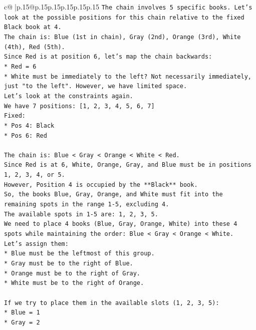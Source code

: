 \documentclass{article}
\begin{document}
{\begin{supertabular}{c@{$\;$}|p{.15\linewidth}@{}p{.15\linewidth}p{.15\linewidth}p{.15\linewidth}p{.15\linewidth}p{.15\linewidth}}
{{{\texttt{The chain involves 5 specific books. Let's look at the possible positions for this chain relative to the fixed Black book at 4.} \\
\texttt{The chain is: Blue (1st in chain), Gray (2nd), Orange (3rd), White (4th), Red (5th).} \\
\texttt{Since Red is at position 6, let's map the chain backwards:} \\
\texttt{*   Red = 6} \\
\texttt{*   White must be immediately to the left? Not necessarily immediately, just "to the left". However, we have limited space.} \\
\texttt{Let's look at the constraints again.} \\
\texttt{We have 7 positions: {[}1, 2, 3, 4, 5, 6, 7{]}} \\
\texttt{Fixed:} \\
\texttt{*   Pos 4: Black} \\
\texttt{*   Pos 6: Red} \\
\\ 
\texttt{The chain is: Blue < Gray < Orange < White < Red.} \\
\texttt{Since Red is at 6, White, Orange, Gray, and Blue must be in positions 1, 2, 3, 4, or 5.} \\
\texttt{However, Position 4 is occupied by the **Black** book.} \\
\texttt{So, the books Blue, Gray, Orange, and White must fit into the remaining spots in the range 1{-}5, excluding 4.} \\
\texttt{The available spots in 1{-}5 are: 1, 2, 3, 5.} \\
\texttt{We need to place 4 books (Blue, Gray, Orange, White) into these 4 spots while maintaining the order: Blue < Gray < Orange < White.} \\
\texttt{Let's assign them:} \\
\texttt{*   Blue must be the leftmost of this group.} \\
\texttt{*   Gray must be to the right of Blue.} \\
\texttt{*   Orange must be to the right of Gray.} \\
\texttt{*   White must be to the right of Orange.} \\
\\ 
\texttt{If we try to place them in the available slots (1, 2, 3, 5):} \\
\texttt{*   Blue = 1} \\
\texttt{*   Gray = 2} \\
}}}
\end{supertabular}}
\end{document}
